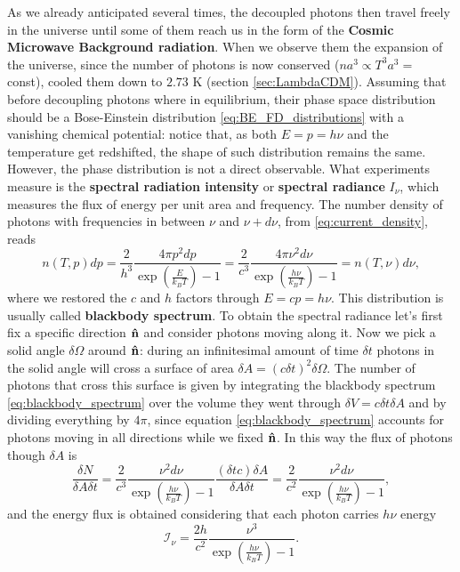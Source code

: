 As we already anticipated several times, the decoupled photons then travel freely in the universe until some of them reach us in the form of the \textbf{Cosmic Microwave Background radiation}. When we observe them the expansion of the universe, since the number of photons is now conserved ($na^{3}\propto T^3a^{3}=$ const), cooled them down to $2.73$ K (section \ref{sec:LambdaCDM}). Assuming that before decoupling photons where in equilibrium, their phase space distribution should be a Bose-Einstein distribution \eqref{eq:BE_FD_distributions} with a vanishing chemical potential: notice that, as  both $E=p=h\nu$ and the temperature get redshifted, the shape of such distribution remains the same. However, the phase distribution is not a direct observable. What experiments measure is the \textbf{spectral radiation intensity} or \textbf{spectral radiance} $I_\nu$, which measures the flux of energy per unit area and frequency. The number density of photons with frequencies in between $\nu$ and $\nu+d\nu$, from \eqref{eq:current_density}, reads 
\begin{equation*}
n(T,p)dp=\frac{2}{h^3}\frac{4\pi p^2dp}{\exp(\frac{E}{k_BT})-1}=\frac{2}{c^3}\frac{4\pi \nu^2d\nu}{\exp(\frac{h\nu}{k_BT})-1}=n(T,\nu)d\nu,
\end{equation*}
where we restored the $c$ and $h$ factors through $E=cp=h\nu$. This distribution is usually called \textbf{blackbody spectrum}. To obtain the spectral radiance let's first fix a specific direction $\mathbf{\hat{n}}$ and consider photons moving along it. Now we pick a solid angle $\delta \Omega$ around $\mathbf{\hat{n}}$: during an infinitesimal amount of time $\delta t$ photons in the solid angle will cross a surface of area $\delta A = (c\delta t)^2\delta\Omega$. The number of photons that cross this surface is given by integrating the blackbody spectrum \eqref{eq:blackbody_spectrum} over the volume they went through $\delta V=c\delta t\delta A$ and by dividing everything by $4\pi$, since equation \eqref{eq:blackbody_spectrum} accounts for photons moving in all directions while we fixed $\mathbf{\hat{n}}$. In this way the flux of photons though $\delta A$ is
$$
\frac{\delta N}{\delta A\delta t}=\frac{2}{c^3}\frac{ \nu^2d\nu}{\exp(\frac{h\nu}{k_BT})-1}\frac{(\delta t c)\delta A}{\delta A \delta t}=\frac{2}{c^2}\frac{\nu^2d\nu}{\exp(\frac{h\nu}{k_BT})-1},
$$
and the energy flux is obtained considering that each photon carries $h\nu$ energy
\begin{equation}\label{eq:blackbody_spectrum}
    \mathcal{I}_\nu=\frac{2h}{c^2}\frac{\nu^3}{\exp(\frac{h\nu}{k_BT})-1}.
\end{equation}
